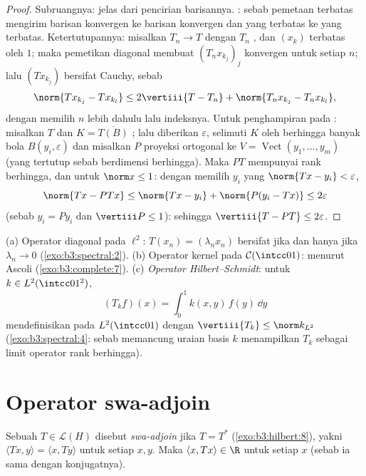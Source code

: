 \begin{proof}
Subruangnya: jelas dari pencirian barisannya. :
sebab pemetaan terbatas mengirim barisan konvergen ke barisan konvergen dan
yang terbatas ke yang terbatas. Ketertutupannya: misalkan $T_n \to T$ dengan $T_n$
, dan $(x_k)$ terbatas oleh $1$; maka pemetikan diagonal
membuat $(T_nx_{k_j})_j$ konvergen untuk setiap $n$; lalu
$(Tx_{k_j})$ bersifat Cauchy, sebab
\[
\norm{Tx_{k_j} - Tx_{k_l}} \leq 2\vertiii{T - T_n} +
\norm{T_nx_{k_j} - T_nx_{k_l}} ,
\]
dengan memilih $n$ lebih dahulu lalu indeksnya. Untuk penghampiran pada : misalkan $T$  dan $K = \overline{T(B)}$ ;
lalu diberikan $\varepsilon$, selimuti $K$ oleh berhingga banyak bola
$B(y_i, \varepsilon)$ dan misalkan $P$ proyeksi ortogonal
ke $V = \operatorname{Vect}(y_1, \dots, y_m)$ (yang tertutup sebab
berdimensi berhingga). Maka $PT$ mempunyai rank berhingga, dan untuk
$\norm x \leq 1$: dengan memilih $y_i$ yang $\norm{Tx - y_i} <
\varepsilon$,
\[
\norm{Tx - PTx} \leq \norm{Tx - y_i} + \norm{P(y_i - Tx)}
\leq 2\varepsilon
\]
(sebab $y_i = Py_i$ dan $\vertiii P \leq 1$): sehingga $\vertiii{T - PT} \leq
2\varepsilon$.
\end{proof}

\begin{example}\label{ex:b3:spectral:examples}
(a) Operator diagonal pada $\ell^2$: $T(x_n) = (\lambda_nx_n)$
bersifat  jika dan hanya jika $\lambda_n \to 0$
(\cref{exo:b3:spectral:2}).
(b) Operator kernel pada $\mathcal C(\intcc01)$:  menurut
Ascoli (\cref{exo:b3:complete:7}).
(c) \emph{Operator Hilbert--Schmidt}: untuk $k \in L^2(\intcc01^2)$,
\[
(T_kf)(x) = \int_0^1k(x, y)\,f(y)\,\dd y
\]
mendefinisikan  pada $L^2(\intcc01)$ dengan
$\vertiii{T_k} \leq \norm k_{L^2}$
(\cref{exo:b3:spectral:4}: sebab memancung uraian basis
$k$ menampilkan $T_k$ sebagai limit operator rank berhingga).
\end{example}

\section{Operator swa-adjoin}

\begin{definition}\label{def:b3:spectral:selfadjoint}
Sebuah $T \in \mathcal L(H)$ disebut \emph{swa-adjoin} jika $T = T^*$ (\cref{exo:b3:hilbert:8}), yakni
$\langle Tx, y\rangle = \langle x, Ty\rangle$ untuk setiap $x, y$.
Maka $\langle x, Tx\rangle \in \R$ untuk setiap $x$ (sebab ia sama dengan
konjugatnya).
\end{definition}

